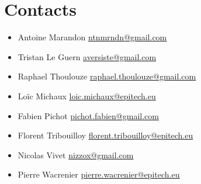 \section{Contacts}

\begin{itemize}
\item Antoine Marandon \protect\url{ntnmrndn@gmail.com}
\item Tristan Le Guern \protect\url{aversiste@gmail.com}
\item Raphael Thoulouze \protect\url{raphael.thoulouze@gmail.com}
\item Loïc Michaux \protect\url{loic.michaux@epitech.eu}
\item Fabien Pichot \protect\url{pichot.fabien@gmail.com}
\item Florent Tribouilloy \protect\url{florent.tribouilloy@epitech.eu}
\item Nicolas Vivet \protect\url{nizzox@gmail.com}
\item Pierre Wacrenier \protect\url{pierre.wacrenier@epitech.eu}
\end{itemize}
